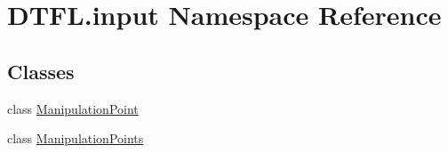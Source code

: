 \hypertarget{namespace_d_t_f_l_1_1input}{}\section{D\+T\+F\+L.\+input Namespace Reference}
\label{namespace_d_t_f_l_1_1input}
\subsection*{Classes}
\begin{DoxyCompactItemize}
\item 
class \hyperlink{class_d_t_f_l_1_1input_1_1_manipulation_point}{Manipulation\+Point}
\item 
class \hyperlink{class_d_t_f_l_1_1input_1_1_manipulation_points}{Manipulation\+Points}
\end{DoxyCompactItemize}
